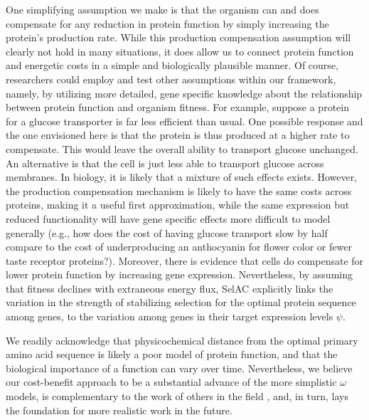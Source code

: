 \documentclass[12pt,letterpaper,fleqn]{article}
\newcommand{\PC}{physicochemical\xspace}
\newcommand{\selac}{SelAC\xspace}
\begin{document}
One simplifying assumption we make is that the organism can and does compensate for any reduction in protein function by simply increasing the protein's production rate.
While this production compensation assumption will clearly not hold in many situations, it does allow us to connect protein function and energetic costs in a simple and biologically plausible manner.
Of course, researchers could employ and test other assumptions within our framework, namely, by utilizing more detailed, gene specific knowledge about the relationship between protein function and organism fitness.
For example, suppose a protein for a glucose transporter is far less efficient than usual.
One possible response and the one envisioned here is that the protein is thus produced at a higher rate to compensate.
This would leave the overall ability to transport glucose unchanged.
An alternative is that the cell is just less able to transport glucose across membranes.
In biology, it is likely that a mixture of such effects exists.
However, the production compensation mechanism is likely to have the same costs across proteins, making it a useful first approximation, while the same expression but reduced functionality will have gene specific effects more difficult to model generally (e.g., how does the cost of having glucose transport slow by half compare to the cost of underproducing an anthocyanin for flower color or fewer taste receptor proteins?).
Moreover, there is evidence that cells do compensate for lower protein function by increasing gene expression.
Nevertheless, by assuming that fitness declines with extraneous energy flux, \selac explicitly links the variation in the strength of stabilizing selection for the optimal protein sequence among genes, to the variation among genes in their target expression levels $\psi$.


We readily acknowledge that \PC distance from the optimal primary amino acid sequence is likely a poor model of protein function, and that the biological importance of a function can vary over time.
Nevertheless, we believe our cost-benefit approach to be a substantial advance of the more simplistic $\omega$ models, is complementary to the work of others in the field \citep[e.g.][]{ThorneEtAl2012,RodrigueAndLartillot2014}, and, in turn, lays the foundation for more realistic work in the future.
\end{document}
